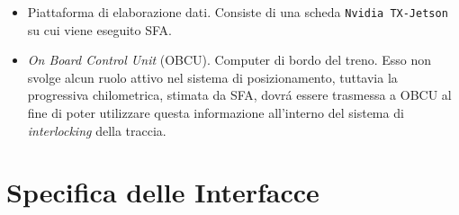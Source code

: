 \begin{itemize}
\begin{itemize}
		Unit\`a incaricata di fornire al sistema i campionamenti dei valori di velocit\`a lineare del treno, espressi in $\frac{m}{s}$.
		\item GPS:
		\\*Unit\`a che fornisce al sistema le misure di posizione del treno.\\*
Le misure di GPS sono riportate in formato standard come tripla di coordinate \texttt{(latitudine, longitudine, altitudine)}, rispettivamente espresse in gradi \texttt{N-S}, in gradi \texttt{E-O} e in \texttt{metri} sul livello del mare.\\*
	\end{itemize}
	\item Piattaforma di elaborazione dati. Consiste di una scheda \texttt{Nvidia TX-Jetson} su cui viene eseguito SFA.
	\item \emph{On Board Control Unit} (OBCU). Computer di bordo del treno. Esso non svolge alcun ruolo attivo nel sistema di posizionamento, tuttavia la progressiva chilometrica, stimata da SFA, dovr\'a essere trasmessa a OBCU al fine di poter utilizzare questa informazione all'interno del sistema di \emph{interlocking} della traccia.
\end{itemize}
	\section{Specifica delle Interfacce}

